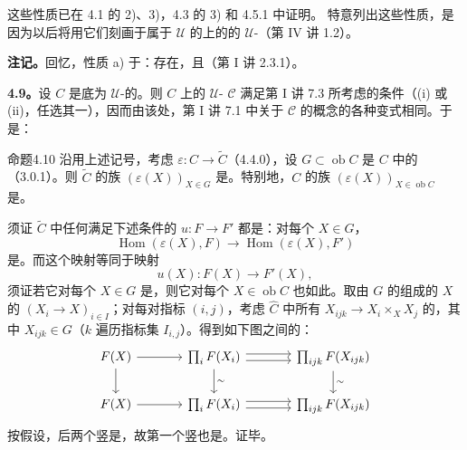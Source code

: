 这些性质已在 4.1 的 2)、3)，4.3 的 3) 和 4.5.1 中证明。
特意列出这些性质，是因为以后将用它们刻画于属于 $\mathcal U$ 的上的的 $\mathcal U$-（第 IV 讲 1.2）。

\textbf{注记。}回忆，性质 a) 于：存在，且（第 I 讲 2.3.1）。

\textbf{4.9。}设 $C$ 是底为 $\mathcal U$-的。则 $C$ 上的 $\mathcal U$- $\mathscr C$ 满足第 I 讲 7.3 所考虑的条件（(i) 或 (ii)，任选其一），因而由该处，第 I 讲 7.1 中关于 $\mathscr C$ 的概念的各种变式相同。于是：
\begin{SGAresult}{命题}{4.10}
沿用上述记号，考虑 $\varepsilon:C\to\widetilde C$（4.4.0），设 $G\subset\operatorname{ob}C$ 是 $C$ 中的（3.0.1）。则 $\widetilde C$ 的族 $(\varepsilon(X))_{X\in G}$ 是。特别地，$C$ 的族 $(\varepsilon(X))_{X\in\operatorname{ob}C}$ 是。
\end{SGAresult}
须证 $\widetilde C$ 中任何满足下述条件的 $u:F\to F'$ 都是：对每个 $X\in G$，
\[\operatorname{Hom}(\varepsilon(X),F)\longrightarrow\operatorname{Hom}(\varepsilon(X),F')\tag{4.10.1}\]
是。而这个映射等同于映射
\[u(X):F(X)\longrightarrow F'(X),\tag{4.10.2}\]
须证若它对每个 $X\in G$ 是，则它对每个 $X\in\operatorname{ob}C$ 也如此。取由 $G$ 的组成的 $X$ 的 $(X_i\to X)_{i\in I}$；对每对指标 $(i,j)$，考虑 $\widehat C$ 中所有 $X_{ijk}\to X_i\times_XX_j$ 的，其中 $X_{ijk}\in G$（$k$ 遍历指标集 $I_{i,j}$）。得到如下图之间的：
\[\begin{tikzcd}[column sep=large]
F(X)\arrow[r]\arrow[d]&\prod_i F(X_i)\arrow[r,shift left=0.6ex]\arrow[r,shift right=0.6ex]\arrow[d,"\sim"]&\prod_{ijk}F(X_{ijk})\arrow[d,"\sim"]\\
F(X)\arrow[r]&\prod_i F(X_i)\arrow[r,shift left=0.6ex]\arrow[r,shift right=0.6ex]&\prod_{ijk}F(X_{ijk})
\end{tikzcd}\]
按假设，后两个竖是，故第一个竖也是。证毕。
